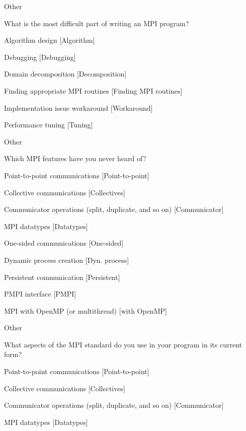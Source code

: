 \documentclass[preprint,5p,times]{elsarticle}
\begin{document}
{\begin{description}
\begin{inparaenum}[{\bf C}1)]
    \item Other
    \end{inparaenum}
  \item[Q15:] What is the most difficult part of writing an MPI program?
    \begin{inparaenum}[{\bf C}1)]
    \item Algorithm design [Algorithm]
    \item Debugging [Debugging]
    \item Domain decomposition [Decomposition]
    \item Finding appropriate MPI routines [Finding MPI routines]
    \item Implementation issue workaround [Workaround]
    \item Performance tuning [Tuning]
    \item Other
    \end{inparaenum}
  \item[Q16*:] Which MPI features have you never heard of?
    \begin{inparaenum}[{\bf C}1)]
    \item Point-to-point communications [Point-to-point]
    \item Collective communications [Collectives]
    \item Communicator operations (split, duplicate, and so on) [Communicator]
    \item MPI datatypes [Datatypes]
    \item One-sided communications [One-sided]
    \item Dynamic process creation [Dyn. process]
    \item Persistent communication [Persistent]
    \item PMPI interface [PMPI]
    \item MPI with OpenMP (or multithread) [with OpenMP]
    \item Other
    \end{inparaenum}
  \item[Q17*:] What aspects of the MPI standard do you use in your program in its current form?
    \begin{inparaenum}[{\bf C}1)]
    \item Point-to-point communications [Point-to-point]
    \item Collective communications [Collectives]
    \item Communicator operations (split, duplicate, and so on) [Communicator]
    \item MPI datatypes [Datatypes]

\end{inparaenum}
\end{description}}
\end{document}
